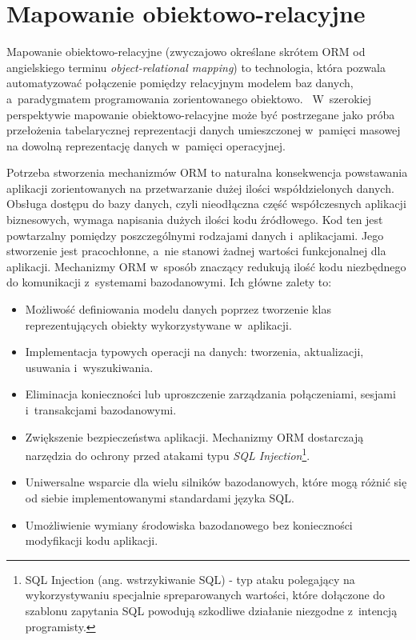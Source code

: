 
\chapter{Mapowanie obiektowo-relacyjne}
\label{chap:object_relational_mapping}

Mapowanie obiektowo-relacyjne (zwyczajowo określane skrótem ORM od angielskiego terminu \emph{object-relational mapping}) to technologia, która pozwala automatyzować połączenie pomiędzy relacyjnym modelem baz danych, a~paradygmatem programowania zorientowanego obiektowo.~\cite{orm_definition} W~szerokiej perspektywie mapowanie obiektowo-relacyjne może być postrzegane jako próba przełożenia tabelarycznej reprezentacji danych umieszczonej w~pamięci masowej na dowolną reprezentację danych w~pamięci operacyjnej.~\cite{fowler_orm_hate} 

Potrzeba stworzenia mechanizmów ORM to naturalna konsekwencja powstawania aplikacji zorientowanych na przetwarzanie dużej ilości współdzielonych danych. Obsługa dostępu do bazy danych, czyli nieodłączna część współczesnych aplikacji biznesowych, wymaga napisania dużych ilości kodu źródłowego. Kod ten jest powtarzalny pomiędzy poszczególnymi rodzajami danych i~aplikacjami. Jego stworzenie jest pracochłonne, a~nie stanowi żadnej wartości funkcjonalnej dla aplikacji. Mechanizmy ORM w~sposób znaczący redukują ilość kodu niezbędnego do komunikacji z~systemami bazodanowymi. Ich główne zalety to:

\begin{itemize}
	\item Możliwość definiowania modelu danych poprzez tworzenie klas reprezentujących obiekty wykorzystywane w~aplikacji.
	\item Implementacja typowych operacji na danych: tworzenia, aktualizacji, usuwania i~wyszukiwania.
	\item Eliminacja konieczności lub uproszczenie zarządzania połączeniami, sesjami i~transakcjami bazodanowymi.
	\item Zwiększenie bezpieczeństwa aplikacji. Mechanizmy ORM dostarczają narzędzia do ochrony przed atakami typu \emph{SQL Injection}\footnote{SQL Injection (ang. wstrzykiwanie SQL) - typ ataku polegający na wykorzystywaniu specjalnie spreparowanych wartości, które dołączone do szablonu zapytania SQL powodują szkodliwe działanie niezgodne z~intencją programisty.}.~\cite{orm_sql_injection_protection}
	\item Uniwersalne wsparcie dla wielu silników bazodanowych, które mogą różnić się od siebie implementowanymi standardami języka SQL. 
	\item Umożliwienie wymiany środowiska bazodanowego bez konieczności modyfikacji kodu aplikacji.
\end{itemize}

